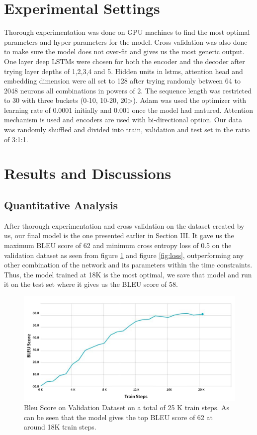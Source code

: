\documentclass[conference]{IEEEtran}
\begin{document}
\section{Experimental Settings}
Thorough experimentation was done on GPU machines to find the most optimal parameters and hyper-parameters for the model. Cross validation was also done to make sure the model does not over-fit and gives us the most generic output. One layer deep LSTMs were chosen for both the encoder and the decoder after trying layer depths of 1,2,3,4 and 5. Hidden units in lstms, attention head and embedding dimension were all set to 128 after trying randomly between 64 to 2048 neurons all combinations in powers of 2. The sequence length was restricted to 30 with three buckets (0-10, 10-20, 20>). Adam was used the optimizer with learning rate of 0.0001 initially and 0.001 once the model had matured. Attention mechanism is used and encoders are used with bi-directional option. Our data was randomly shuffled and divided into train, validation and test set in the ratio of 3:1:1.

\section{Results and Discussions}

\subsection{Quantitative Analysis}
After thorough experimentation and cross validation on the dataset created by us, our final model is the one presented earlier in Section III. It gave us the maximum BLEU score of 62 and minimum cross entropy loss of 0.5 on the validation dataset as seen from figure \ref{fig:bleu-score} and figure \ref{fig:loss}, outperforming any other combination of the network and its parameters within the time constraints. Thus, the model trained at 18K is the most optimal, we save that model and run it on the test set where it gives us the BLEU score of 58. 
 
\begin{figure}[h!]
  \centering
    \includegraphics[width=\linewidth]{bleu-score.png}
  \caption{Bleu Score on Validation Dataset on a total of 25 K train steps. As can be seen that the model gives the top BLEU score of 62 at around 18K train steps.}
  \label{fig:bleu-score}
\end{figure}
\end{document}

